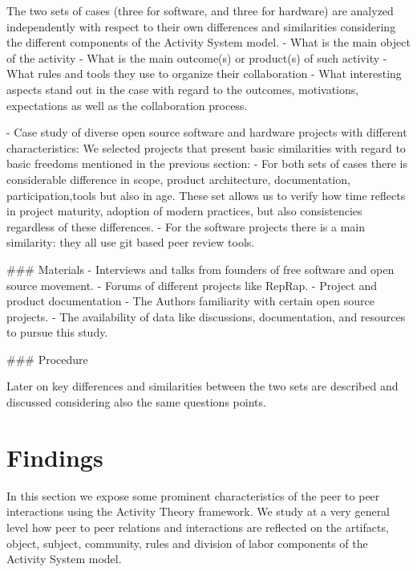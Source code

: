 \documentclass{ICED-Paper}%
\begin{document}
The two sets of cases (three for software, and three for hardware) are analyzed independently with respect to their own differences and similarities considering the different components of the Activity System model.
- What is the main object of the activity
- What is the main outcome(s) or product(s) of such activity
- What rules and tools they use to organize their collaboration
- What interesting aspects stand out in the case with regard to the outcomes, motivations, expectations as well as the collaboration process.



- Case study of diverse open source software and hardware projects with different characteristics:
We selected projects that present basic similarities with regard to basic freedoms mentioned in the previous section:
- For both sets of cases there is considerable difference in scope, product architecture, documentation, participation,tools but also in age. These set allows us to verify how time reflects in project maturity, adoption of modern practices, but also consistencies regardless of these differences.
- For the software projects there is a main similarity: they all use git based peer review tools.

### Materials
- Interviews and talks from founders of free software and open source movement.
- Forums of different projects like RepRap.
- Project and product documentation
- The Authors familiarity with certain open source projects.
- The availability of data like discussions, documentation, and resources to pursue this study.

### Procedure

Later on key differences and similarities between the two sets are described and discussed considering also the same questions points.

\section{Findings}

In this section we expose some prominent characteristics of the peer to peer interactions using the Activity Theory framework. We study at a very general level how peer to peer relations and interactions are reflected on the artifacts, object, subject, community, rules and division of labor components of the Activity System model.
\end{document}
